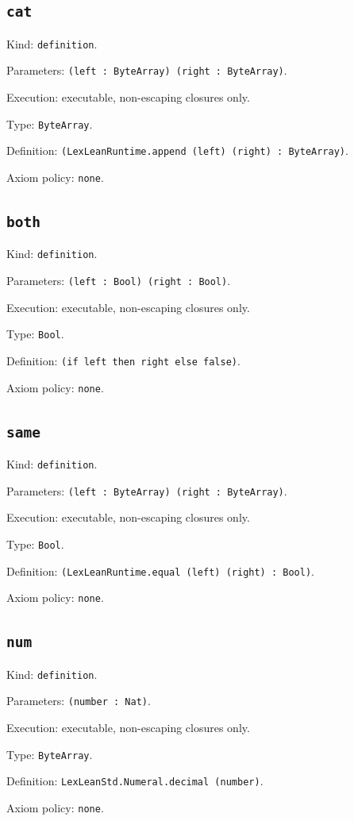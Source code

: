 \documentclass[11pt]{article}
\begin{document}
\subsection*{\texttt{cat}}
\noindent Kind: \texttt{definition}.\par
\noindent Parameters: \texttt{(left : ByteArray) (right : ByteArray)}.\par
\noindent Execution: executable, non-escaping closures only.\par
\noindent Type: \texttt{ByteArray}.\par
\noindent Definition: \texttt{(LexLeanRuntime.append (left) (right) : ByteArray)}.\par
\noindent Axiom policy: \texttt{none}.\par
\subsection*{\texttt{both}}
\noindent Kind: \texttt{definition}.\par
\noindent Parameters: \texttt{(left : Bool) (right : Bool)}.\par
\noindent Execution: executable, non-escaping closures only.\par
\noindent Type: \texttt{Bool}.\par
\noindent Definition: \texttt{(if left then right else false)}.\par
\noindent Axiom policy: \texttt{none}.\par
\subsection*{\texttt{same}}
\noindent Kind: \texttt{definition}.\par
\noindent Parameters: \texttt{(left : ByteArray) (right : ByteArray)}.\par
\noindent Execution: executable, non-escaping closures only.\par
\noindent Type: \texttt{Bool}.\par
\noindent Definition: \texttt{(LexLeanRuntime.equal (left) (right) : Bool)}.\par
\noindent Axiom policy: \texttt{none}.\par
\subsection*{\texttt{num}}
\noindent Kind: \texttt{definition}.\par
\noindent Parameters: \texttt{(number : Nat)}.\par
\noindent Execution: executable, non-escaping closures only.\par
\noindent Type: \texttt{ByteArray}.\par
\noindent Definition: \texttt{LexLeanStd.Numeral.decimal (number)}.\par
\noindent Axiom policy: \texttt{none}.\par
\end{document}
